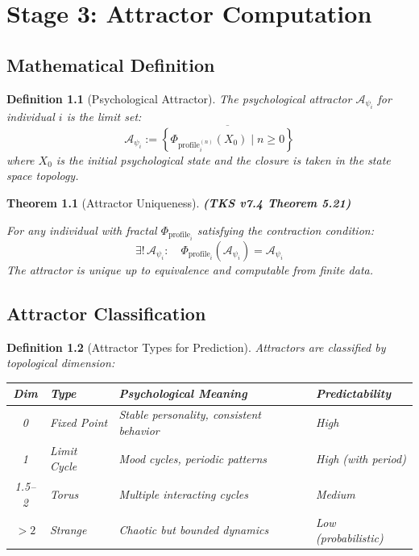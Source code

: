 \documentclass[11pt,twoside]{book}
\renewcommand{\arraystretch}{1.2}
\newcommand{\PsychAttractor}{\mathcal{A}_\psi}
\newcommand{\ProfileFrac}{\Phi_{\mathrm{profile}}}
\newtheorem{definition}{Definition}[chapter]
\newtheorem{theorem}{Theorem}[chapter]
\begin{document}
\chapter{Stage 3: Attractor Computation}
\label{ch:stage3-attractor}

\section{Mathematical Definition}

\begin{definition}[Psychological Attractor]
\label{def:psych-attractor-pred}
The \emph{psychological attractor} $\PsychAttractor_i$ for individual $i$ is the limit set:
\[
    \PsychAttractor_i := \overline{\left\{ \ProfileFrac_i^{(n)}(X_0) \mid n \geq 0 \right\}}
\]
where $X_0$ is the initial psychological state and the closure is taken in the state space topology.
\end{definition}

\begin{theorem}[Attractor Uniqueness]
\label{thm:attractor-unique}
\textbf{(TKS v7.4 Theorem 5.21)}

For any individual with fractal $\ProfileFrac_i$ satisfying the contraction condition:
\[
    \exists!\, \PsychAttractor_i : \quad \ProfileFrac_i(\PsychAttractor_i) = \PsychAttractor_i
\]
The attractor is unique up to equivalence and computable from finite data.
\end{theorem}

\section{Attractor Classification}

\begin{definition}[Attractor Types for Prediction]
\label{def:attractor-types-pred}
Attractors are classified by topological dimension:

\begin{center}
\renewcommand{\arraystretch}{1.3}
\begin{tabularx}{\textwidth}{c|l|X|X}
\toprule
\textbf{Dim} & \textbf{Type} & \textbf{Psychological Meaning} & \textbf{Predictability} \\
\midrule
0 & Fixed Point & Stable personality, consistent behavior & High \\
1 & Limit Cycle & Mood cycles, periodic patterns & High (with period) \\
1.5--2 & Torus & Multiple interacting cycles & Medium \\
$>2$ & Strange & Chaotic but bounded dynamics & Low (probabilistic) \\
\bottomrule
\end{tabularx}
\end{center}
\end{definition}
\end{document}
